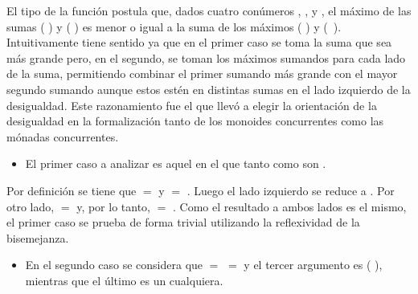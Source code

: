 \begin{AgdaAlign}
El tipo de la función  postula que, dados cuatro conúmeros , ,  y , el máximo de las sumas ( \AgdaFunction{+} ) y ( \AgdaFunction{+} ) es menor o igual a la suma de los máximos (  ) y \hbox{(  )}. Intuitivamente tiene sentido ya que en el primer caso se toma la suma que sea más grande pero, en el segundo, se toman los máximos sumandos para cada lado de la suma, permitiendo combinar el primer sumando más grande con el mayor segundo sumando aunque estos estén en distintas sumas en el lado izquierdo de la desigualdad. Este razonamiento fue el que llevó a elegir la orientación de la desigualdad en la formalización tanto de los monoides concurrentes como las mónadas concurrentes. 

\begin{itemize}
\item El primer caso a analizar es aquel en el que tanto  como 
 son . 
\end{itemize}

Por definición se tiene que  \AgdaFunction{+}  $=$  y  \AgdaFunction{+}  $=$ . Luego el lado izquierdo se reduce a   . Por otro lado,    $=$  y, por lo tanto,    \AgdaFunction{+}   $=$  . Como el resultado a ambos lados es el mismo, el primer caso se prueba de forma trivial utilizando la reflexividad de la bisemejanza.

\begin{itemize}
\item En el segundo caso se considera que  $=$  $=$ 
 y el tercer argumento es ( ), mientras que el último es un  cualquiera. 
\end{itemize}


\end{AgdaAlign}
